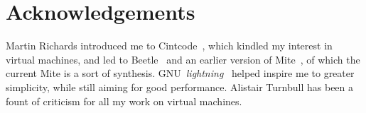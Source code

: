 \documentclass[a4paper]{article}
\begin{document}
\section*{Acknowledgements}

Martin Richards introduced me to Cintcode~\cite{cintweb}, which
kindled my interest in virtual machines, and led to
Beetle~\cite{beetledis} and an earlier version of Mite~\cite{mite0},
of which the current Mite is a sort of synthesis.
GNU~\emph{lightning}~\cite{lightning} helped inspire me to greater
simplicity, while still aiming for good performance. Alistair Turnbull
has been a fount of criticism for all my work on virtual machines.



\end{document}
